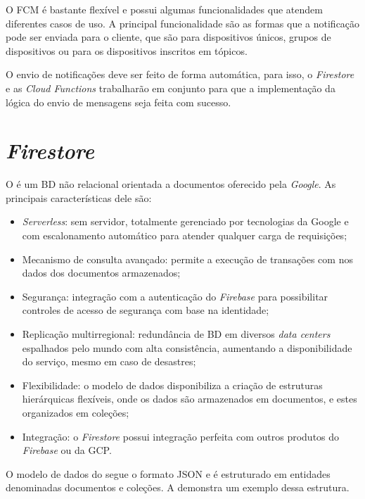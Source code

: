 O FCM é bastante flexível e possui algumas funcionalidades que atendem diferentes casos de uso. A principal funcionalidade são as formas que a notificação pode ser enviada para o cliente, que são para dispositivos únicos, grupos de dispositivos ou para os dispositivos inscritos em tópicos. 

O envio de notificações deve ser feito de forma automática, para isso, o \textit{Firestore} e as \textit{Cloud Functions} trabalharão em conjunto para que a implementação da lógica do envio de mensagens seja feita com sucesso.

\section{\textit{Firestore}}\label{sec:firestore}

O \textcite{FirestoreDocs} é um BD não relacional orientada a documentos oferecido pela \textit{Google}. As principais características dele são:

\begin{itemize}
    \item \textit{Serverless}: sem servidor, totalmente gerenciado por tecnologias da Google e com escalonamento automático para atender qualquer carga de requisições;
    \item Mecanismo de consulta avançado: permite a execução de transações com  nos dados dos documentos armazenados;
    \item Segurança: integração com a autenticação do \textit{Firebase} para possibilitar controles de acesso de segurança com base na identidade;
    \item Replicação multirregional: redundância de BD em diversos \textit{data centers} espalhados pelo mundo com alta consistência, aumentando a disponibilidade do serviço, mesmo em caso de desastres;
    \item Flexibilidade: o modelo de dados disponibiliza a criação de estruturas hierárquicas flexíveis, onde os dados são armazenados em documentos, e estes organizados em coleções;
    \item Integração: o \textit{Firestore} possui integração perfeita com outros produtos do \textit{Firebase} ou da GCP.
\end{itemize}

O modelo de dados do \textcite{FirestoreDataModel} segue o formato JSON e é estruturado em entidades denominadas documentos e coleções. A  demonstra um exemplo dessa estrutura.

